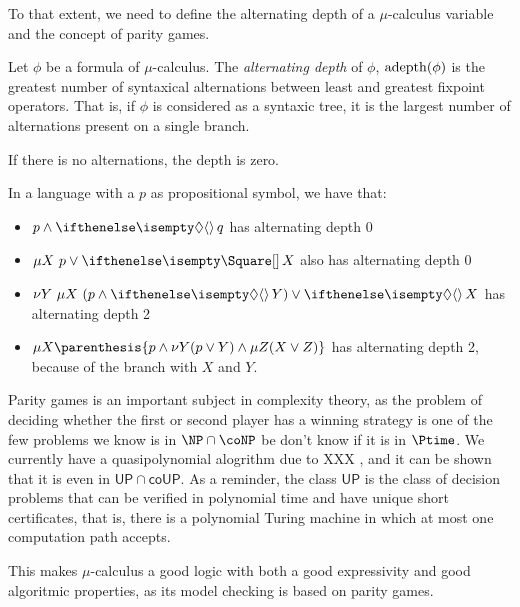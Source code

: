 To that extent, we need to define the alternating depth
of a $\mu$-calculus variable and the concept of parity games.

\begin{definition}
Let $\phi$ be a formula of $\mu$-calculus.
The \emph{alternating depth} of $\phi$, $\mathrm{adepth}(\phi)$
is the greatest number of syntaxical alternations between least and greatest
fixpoint operators. That is, if $\phi$ is considered as a syntaxic tree,
it is the largest number of alternations present on a single branch.

If there is no alternations, the depth is zero.
\end{definition}

\begin{example}
    In a language with a $p$ as propositional symbol, we have that:
\begin{itemize}
    \item $p \wedge \diam{}q$ has alternating depth 0
    \item $\mu X~ p \vee \boite{} X$ also has alternating depth 0
    \item $\nu Y~ \mu X~ (p \wedge \diam{} Y) \vee \diam{} X$ has alternating depth 2
    \item $\mu X \parenthesis{p \wedge \nu Y (p \vee Y) \wedge \mu Z (X \vee Z)}$ has alternating
        depth 2, because of the branch with $X$ and $Y$.
\end{itemize}
\end{example}

Parity games is an important subject in complexity theory,
as the problem of deciding whether the first or second player
has a winning strategy is one of the few problems we know is
in $\NP \cap \coNP$ be don't know if it is in $\Ptime$.
We currently have a quasipolynomial alogrithm due to XXX ,
and it can be shown that it is even in $\mathsf{UP} \cap \mathsf{coUP}$.
As a reminder, the class $\mathsf{UP}$ is the class of decision problems
that can be verified in polynomial time and have unique short certificates,
that is, there is a polynomial Turing machine in which at most one computation path accepts.

This makes $\mu$-calculus a good logic with both a good expressivity and
good algoritmic properties, as its model checking is based on parity games.

